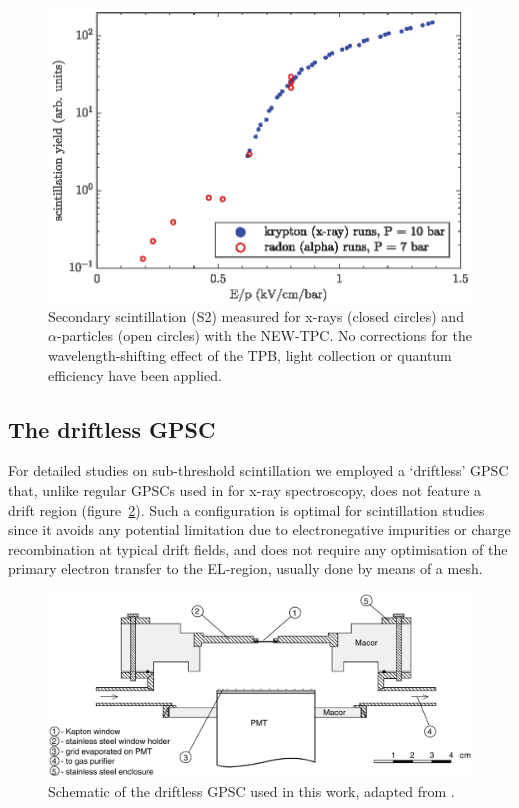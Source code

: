 \documentclass[%
 reprint,
superscriptaddress,
 amsmath,amssymb,
 aps,
]{revtex4-2}
\begin{document}
\begin{figure}[tb]
\centering
\includegraphics{Fig5.eps}
\hfill
\caption{\label{NEXTdata} Secondary scintillation (S2) measured for x-rays (closed circles) and $\alpha$-particles (open circles) with the NEW-TPC. No corrections for the wavelength-shifting effect of the TPB, light collection or quantum efficiency have been applied.}
\end{figure}


\subsection{\label{subsec:dGPSC}The driftless GPSC}
For detailed studies on sub-threshold scintillation we employed a `driftless' GPSC that, unlike regular GPSCs used in \cite{43} for x-ray spectroscopy, does not feature a drift region (figure~\ref{fig:dGPSC}). Such a configuration is optimal for scintillation studies since it avoids any potential limitation due to electronegative impurities or charge recombination at typical drift fields, and does not require any optimisation of the primary electron transfer to the EL-region, usually done by means of a mesh.

\begin{figure}[tbp]
\centering %
\includegraphics[width=\textwidth,height=\textheight,keepaspectratio]{Fig6.eps}
\caption{\label{fig:dGPSC}Schematic of the driftless GPSC used in this work, adapted from \cite{44}.}
\end{figure}
\end{document}
